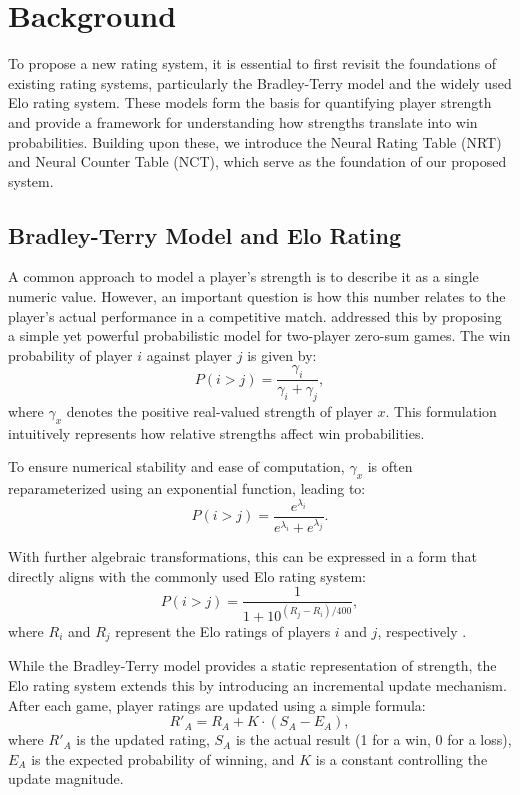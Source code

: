\section{Background}

To propose a new rating system, it is essential to first revisit the foundations of existing rating systems, particularly the Bradley-Terry model and the widely used Elo rating system. These models form the basis for quantifying player strength and provide a framework for understanding how strengths translate into win probabilities. Building upon these, we introduce the Neural Rating Table (NRT) and Neural Counter Table (NCT), which serve as the foundation of our proposed system.

\subsection{Bradley-Terry Model and Elo Rating}

A common approach to model a player's strength is to describe it as a single numeric value. However, an important question is how this number relates to the player's actual performance in a competitive match. \citet{bradley_terry} addressed this by proposing a simple yet powerful probabilistic model for two-player zero-sum games. The win probability of player $i$ against player $j$ is given by:
\begin{equation}
\label{bt_win_value}
P(i > j) = \frac{\gamma_i}{\gamma_i + \gamma_j},
\end{equation}
where $\gamma_x$ denotes the positive real-valued strength of player $x$. This formulation intuitively represents how relative strengths affect win probabilities.

To ensure numerical stability and ease of computation, $\gamma_x$ is often reparameterized using an exponential function, leading to:
\begin{equation}
\label{bt_win_value_exp}
P(i > j) = \frac{e^{\lambda_i}}{e^{\lambda_i} + e^{\lambda_j}}.
\end{equation}

With further algebraic transformations, this can be expressed in a form that directly aligns with the commonly used Elo rating system:
\begin{equation}
P(i > j) = \frac{1}{1 + 10^{(R_j - R_i)/400}},
\end{equation}
where $R_i$ and $R_j$ represent the Elo ratings of players $i$ and $j$, respectively \citep{elo}. 

While the Bradley-Terry model provides a static representation of strength, the Elo rating system extends this by introducing an incremental update mechanism. After each game, player ratings are updated using a simple formula:
\begin{equation}
R'_A = R_A + K \cdot (S_A - E_A),
\end{equation}
where $R'_A$ is the updated rating, $S_A$ is the actual result (1 for a win, 0 for a loss), $E_A$ is the expected probability of winning, and $K$ is a constant controlling the update magnitude.

